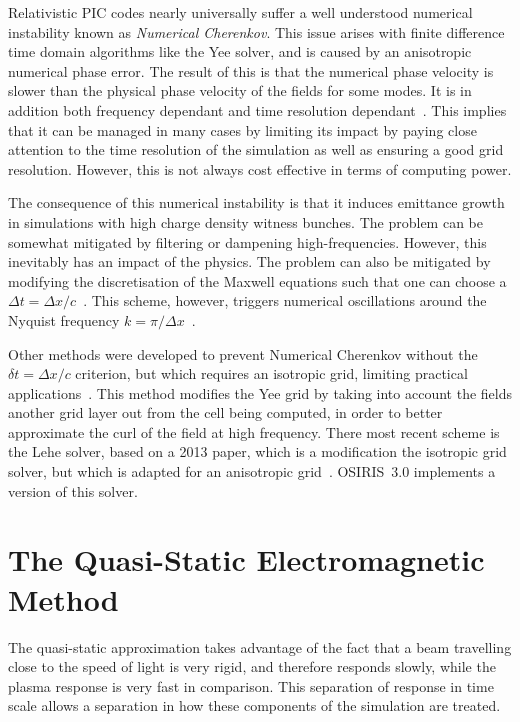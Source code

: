 Relativistic PIC codes nearly universally suffer a well understood numerical instability known as \textit{Numerical Cherenkov}.
This issue arises with finite difference time domain algorithms like the Yee solver, and is caused by an anisotropic numerical phase error.
The result of this is that the numerical phase velocity is slower than the physical phase velocity of the fields for some modes.
It is in addition both frequency dependant and time resolution dependant~\cite{godfrey:1974, greenwood:2004}.
This implies that it can be managed in many cases by limiting its impact by paying close attention to the time resolution of the simulation as well as ensuring a good grid resolution.
However, this is not always cost effective in terms of computing power.

The consequence of this numerical instability is that it induces emittance growth in simulations with high charge density witness bunches.
The problem can be somewhat mitigated by filtering or dampening high-frequencies.
However, this inevitably has an impact of the physics.
The problem can also be mitigated by modifying the discretisation of the Maxwell equations such that one can choose a $\Delta t = \Delta x/c$~\cite{pukhov:1999}.
This scheme, however, triggers numerical oscillations around the Nyquist frequency $k = \pi/\Delta x$~\cite{vay:2011a}.

Other methods were developed to prevent Numerical Cherenkov without the $\delta t = \Delta x/c$ criterion, but which requires an isotropic grid, limiting practical applications~\cite{greenwood:2004}.
This method modifies the Yee grid by taking into account the fields another grid layer out from the cell being computed, in order to better approximate the curl of the field at high frequency.
There most recent scheme is the Lehe solver, based on a 2013 paper, which is a modification the isotropic grid solver, but which is adapted for an anisotropic grid~\cite{lehe:2013}.
OSIRIS~3.0 implements a version of this solver.

\section{The Quasi-Static Electromagnetic Method}
\label{PIC:QS}

The quasi-static approximation takes advantage of the fact that a beam travelling close to the speed of light is very rigid, and therefore responds slowly, while the plasma response is very fast in comparison.
This separation of response in time scale allows a separation in how these components of the simulation are treated.

